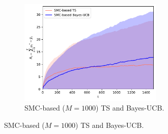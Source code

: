 \begin{figure}[!h]
	\centering
	\begin{subfigure}[b]{\textwidth}
		\centering
		\includegraphics[width=0.75\textwidth]{./fods_figs/static/logistic/A2/theta-1._-1._1._1._M1000_cumulative_regret}
		\caption{SMC-based ($M=1000$) TS and Bayes-UCB.}
	\end{subfigure}
	

\end{figure}
